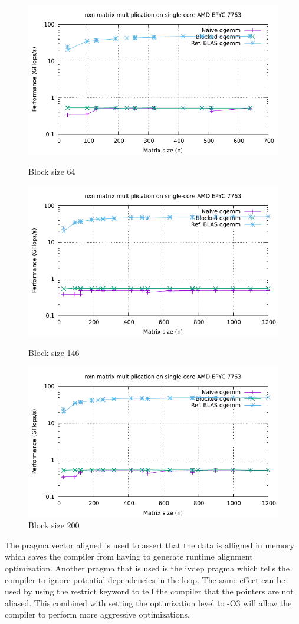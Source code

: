 \documentclass[unicode,11pt,a4paper,oneside,numbers=endperiod,openany]{scrartcl}
\begin{document}
\begin{figure}[H]
    \centering
    \includegraphics[width=0.7\linewidth]{timing_64.pdf}
    \caption{Block size 64}
    \label{fig:image1}
    
    \vspace{10pt}
    
    \includegraphics[width=0.7\linewidth]{timing_146.pdf}
    \caption{Block size 146}
    \label{fig:image2}
    
    \vspace{10pt}
    
    \includegraphics[width=0.7\linewidth]{timing_200.pdf}
    \caption{Block size 200}
    \label{fig:image3}
\end{figure}

The pragma vector aligned is used to assert that the data is alligned in memory which saves the compiler from having to generate runtime alignment optimization.
Another pragma that is used is the ivdep pragma which tells the compiler to ignore potential dependencies in the loop.
The same effect can be used by using the restrict keyword to tell the compiler that the pointers are not aliased. 
This combined with setting the optimization level to -O3 will allow the compiler to perform more aggressive optimizations.
\end{document}
